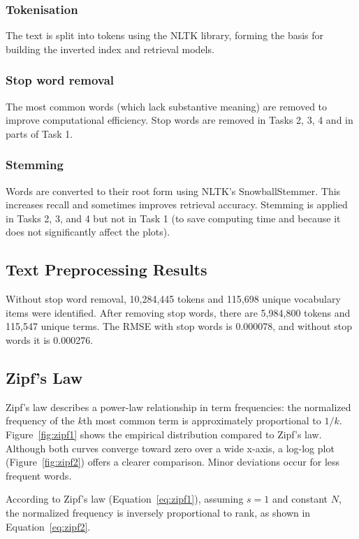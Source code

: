 \documentclass[11pt]{article}
\begin{document}
\subsubsection{Tokenisation}
The text is split into tokens using the NLTK library, forming the basis for building the inverted index and retrieval models.

\subsubsection{Stop word removal}
The most common words (which lack substantive meaning) are removed to improve computational efficiency. Stop words are removed in Tasks 2, 3, 4 and in parts of Task 1.

\subsubsection{Stemming}
Words are converted to their root form using NLTK's SnowballStemmer. This increases recall and sometimes improves retrieval accuracy. Stemming is applied in Tasks 2, 3, and 4 but not in Task 1 (to save computing time and because it does not significantly affect the plots).

\subsection{Text Preprocessing Results}
Without stop word removal, 10,284,445 tokens and 115,698 unique vocabulary items were identified. After removing stop words, there are 5,984,800 tokens and 115,547 unique terms. The RMSE with stop words is 0.000078, and without stop words it is 0.000276.

\subsection{Zipf's Law}
Zipf's law describes a power-law relationship in term frequencies: the normalized frequency of the \(k\)th most common term is approximately proportional to \(1/k\). Figure~\ref{fig:zipf1} shows the empirical distribution compared to Zipf's law. Although both curves converge toward zero over a wide x-axis, a log-log plot (Figure~\ref{fig:zipf2}) offers a clearer comparison. Minor deviations occur for less frequent words.

According to Zipf's law (Equation~\ref{eq:zipf1}), assuming \(s=1\) and constant \(N\), the normalized frequency is inversely proportional to rank, as shown in Equation~\ref{eq:zipf2}.
\end{document}
